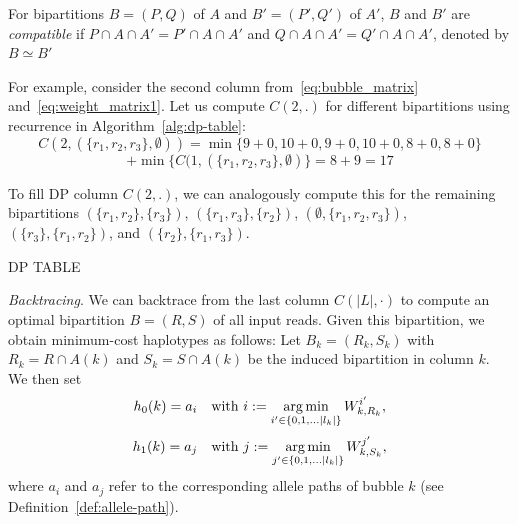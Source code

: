 \begin{definition}
For bipartitions $B = (P, Q)$ of $A$ and $B' = (P', Q')$ of $A'$, $B$ and $B'$ are \emph{compatible} if $P \cap A \cap A' = P' \cap A \cap A'$ and $Q \cap A \cap A' = Q' \cap A \cap A'$, denoted by $B \simeq B'$
\end{definition}

For example, consider the second column from~\eqref{eq:bubble_matrix} and~\eqref{eq:weight_matrix1}. Let us compute $C(2,.)$ for different bipartitions using recurrence in Algorithm~\ref{alg:dp-table}:
\[C(2, (\{r_1,r_2,r_3\},\emptyset)) = \min\{9+0, 10+0, 9+0,10+0, 8+0, 8+0\} \]
\[ + \min\{C(1, (\{r_1,r_2,r_3\},\emptyset)\} = 8+9 = 17 \]

To fill DP column $C(2,.)$, we can analogously compute this for the remaining bipartitions $(\{r_1,r_2\},\{r_3\})$,
$(\{r_1,r_3\},\{r_2\})$, $(\emptyset,\{r_1,r_2,r_3\})$, $(\{r_3\},\{r_1,r_2\})$, and $(\{r_2\},\{r_1,r_3\})$.

\begin{algorithm}
    \caption{\label{alg:dp-table}\textsc{DP TABLE}}
\end{algorithm}

\textit{Backtracing}. We can backtrace from the last column $C(|L|, \cdot)$ to compute an optimal bipartition $B=(R,S)$ of all input reads.
Given this bipartition, we obtain minimum-cost haplotypes as follows:
Let $B_k=(R_k,S_k)$ with $R_k=R\cap A(k)$ and $S_k=S\cap A(k)$ be the induced bipartition in column $k$.
We then set
\begin{equation}\label{eqn:haplo_c1}
h_0(k)= a_i \quad \text{with } i:=\operatorname*{arg\,min}_{i'\in \{0,1, \ldots |l_k|\}} W_{k,{R_k}}^{i'}, \nonumber
\end{equation}
\begin{equation}\label{eqn:haplo_c2}
h_1(k)= a_j \quad \text{with } j:=\operatorname*{arg\,min}_{j'\in \{0,1, \ldots |l_k|\}} W_{k,{S_k}}^{j'}, \nonumber
\end{equation}
where $a_i$ and $a_j$ refer to the corresponding allele paths of bubble $k$ (see Definition~\ref{def:allele-path}).

